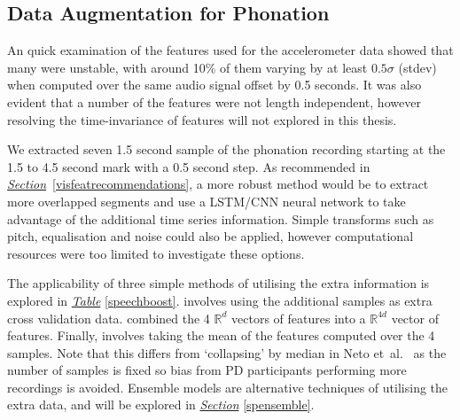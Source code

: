 \documentclass[12pt, twoside]{book}
\renewcommand\emph[1]{\textit{\color{USred}{#1}}}
\begin{document}
\subsection{Data Augmentation for Phonation}
An quick examination of the features used for the accelerometer data showed that many were unstable, with around 10\% of them varying by at least $0.5\sigma$ (stdev) when computed over the same audio signal offset by 0.5 seconds. It was also evident that a number of the features were not length independent, however resolving the time-invariance of features will not explored in this thesis.

We extracted seven 1.5 second sample of the phonation recording starting at the 1.5 to 4.5 second mark with a 0.5 second step. As recommended in \textit{\hyperref[visfeatrecommendations]{Section}}~\ref{visfeatrecommendations}, a more robust method would be to extract more overlapped segments and use a LSTM/CNN neural network to take advantage of the additional time series information. Simple transforms such as pitch, equalisation and noise could also be applied, however computational resources were too limited to investigate these options. 


The applicability of three simple methods of utilising the extra information is explored in \textit{\hyperref[speechboost]{Table}} \ref{speechboost}. \emph{Augmentation} involves using the additional samples as extra cross validation data. \emph{Merging} combined the 4 $\mathbb{R}^d$ vectors of features into a $\mathbb{R}^{4d}$ vector of features. Finally, \emph{Meanify} involves taking the mean of the features computed over the 4 samples. Note that this differs from `collapsing' by median in Neto et~al.~\cite{mpowerneto2017analysis} as the number of samples is fixed so bias from PD participants performing more recordings is avoided. Ensemble models are alternative techniques of utilising the extra data, and will be explored in \textit{\hyperref[spensemble]{Section}} \ref{spensemble}. 
\end{document}
